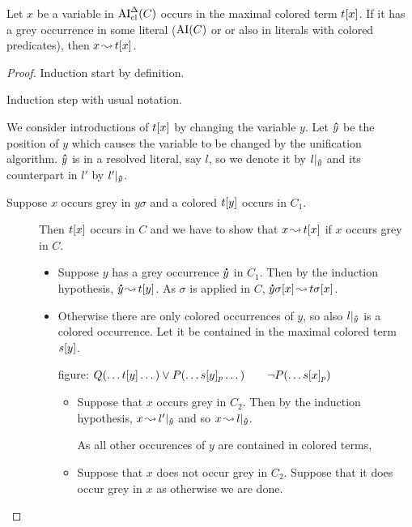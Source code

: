 \documentclass[,%
	paper=a4,%
	DIV11, %
	twoside=false,%
	liststotoc,
	bibtotoc,
	draft=false,%
	numbers=noendperiod
]{scrartcl}
\begin{document}


\begin{clemma}
	\label{lemma:arrow_from_grey_to_colored}
	Let $x$ be a variable in $\operatorname{AI}_\mathrm{cl}^\Delta(C)$ occurs in the maximal colored term $t[x]$.
	If it has a grey occurrence in some literal ($\operatorname{AI}(C)$ or or also in literals with colored predicates), then $x\operatorname{\leadsto} t[x]$.
\end{clemma}
\begin{proof}
	Induction start by definition.

	Induction step with usual notation.

	We consider introductions of $t[x]$ by changing the variable $y$.
	Let $\bm\hat y$ be the position of $y$ which causes the variable to be changed by the unification algorithm.
	$\bm\hat y$ is in a resolved literal, say $l$, so we denote it by $l|_{\bm\hat y}$ and its counterpart in $l'$ by $l'|_{\bm\hat y}$. 

	\begin{description}
		\item[Suppose $x$ occurs grey in $y\sigma$ and a colored $t[y]$ occurs in $C_1$.]
			Then $t[x]$ occurs in $C$ and we have to show that $x\operatorname{\leadsto} t[x]$ if $x$ occurs grey in $C$.

			\begin{itemize}
				\item Suppose $y$ has a grey occurrence $\bm\dot y$ in $C_1$.
					Then by the induction hypothesis, $\bm\dot y\operatorname{\leadsto} t[y]$. 
					As $\sigma$ is applied in $C$, $\bm\dot y\sigma[x]\operatorname{\leadsto} t\sigma[x]$.

				\item Otherwise there are only colored occurrences of $y$, so also $l|_{\bm\hat y}$ is a colored occurrence. Let it be contained in the maximal colored term $s[y]$.

					figure: $Q(\dots t[y] \dots) \lor P(\dots s{[y]_{p}} \dots)\quad\quad \lnot P(\dots s{[x]_{p}})$

					\begin{itemize}
						\item Suppose that $x$ occurs grey in $C_2$. Then by the induction hypothesis, $x\operatorname{\leadsto} l'|_{\bm\hat y}$ and so
							$x\operatorname{\leadsto} l|_{\bm\hat y}$.

							As all other occurences of $y$ are contained in colored terms, 
							
						\item Suppose that $x$ does not occur grey in $C_2$.
							Suppose that it does occur grey in $x$ as otherwise we are done.


\end{itemize}
\end{itemize}
\end{description}
\end{proof}
\end{document}
